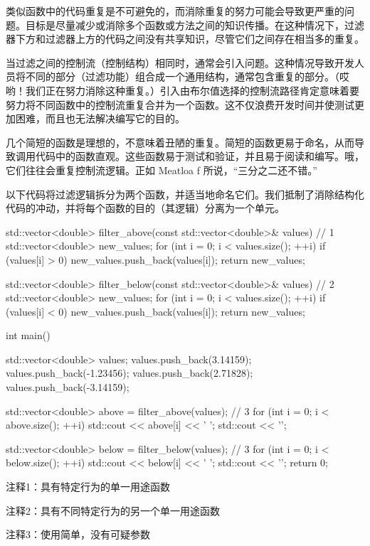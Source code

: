 
类似函数中的代码重复是不可避免的，而消除重复的努力可能会导致更严重的问题。目标是尽量减少或消除多个函数或方法之间的知识传播。在这种情况下，过滤器下方和过滤器上方的代码之间没有共享知识，尽管它们之间存在相当多的重复。

当过滤之间的控制流（控制结构）相同时，通常会引入问题。这种情况导致开发人员将不同的部分（过滤功能）组合成一个通用结构，通常包含重复的部分。（哎哟！我们正在努力消除这种重复。）引入由布尔值选择的控制流路径肯定意味着要努力将不同函数中的控制流重复合并为一个函数。这不仅浪费开发时间并使测试更加困难，而且也无法解决编写它的目的。

几个简短的函数是理想的，不意味着丑陋的重复。简短的函数更易于命名，从而导致调用代码中的函数直观。这些函数易于测试和验证，并且易于阅读和编写。哦，它们往往会重复控制流逻辑。正如 Meatloa f 所说，“三分之二还不错。”

以下代码将过滤逻辑拆分为两个函数，并适当地命名它们。我们抵制了消除结构化代码的冲动，并将每个函数的目的（其逻辑）分离为一个单元。


\begin{cpp}
std::vector<double> filter_above(const
    std::vector<double>& values) { // 1
  std::vector<double> new_values;
  for (int i = 0; i < values.size(); ++i)
    if (values[i] > 0)
      new_values.push_back(values[i]);
  return new_values;
}

std::vector<double> filter_below(const
    std::vector<double>& values) { // 2
  std::vector<double> new_values;
  for (int i = 0; i < values.size(); ++i)
    if (values[i] < 0)
      new_values.push_back(values[i]);
  return new_values;
}

int main() {
  std::vector<double> values;
  values.push_back(3.14159);
  values.push_back(-1.23456);
  values.push_back(2.71828);
  values.push_back(-3.14159);

  std::vector<double> above = filter_above(values); // 3
  for (int i = 0; i < above.size(); ++i)
    std::cout << above[i] << ' ';
  std::cout << '\n';

  std::vector<double> below = filter_below(values); // 3
  for (int i = 0; i < below.size(); ++i)
    std::cout << below[i] << ' ';
  std::cout << '\n';
  return 0;
}
\end{cpp}

{\footnotesize
注释1：具有特定行为的单一用途函数

注释2：具有不同特定行为的另一个单一用途函数

注释3：使用简单，没有可疑参数
}

